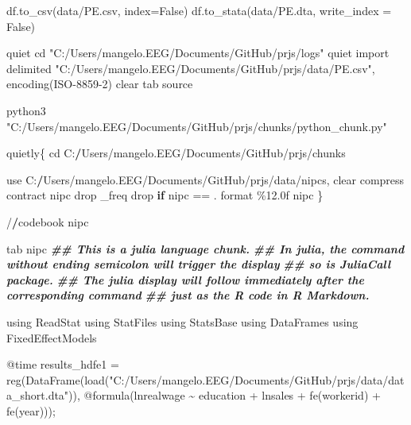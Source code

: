 \documentclass[
  12pt,
]{article}
\newenvironment{Shaded}{\begin{snugshade}}{\end{snugshade}}
\newcommand{\AttributeTok}[1]{\textcolor[rgb]{0.77,0.63,0.00}{#1}}
\newcommand{\ControlFlowTok}[1]{\textcolor[rgb]{0.13,0.29,0.53}{\textbf{#1}}}
\newcommand{\DecValTok}[1]{\textcolor[rgb]{0.00,0.00,0.81}{#1}}
\newcommand{\DocumentationTok}[1]{\textcolor[rgb]{0.56,0.35,0.01}{\textbf{\textit{#1}}}}
\newcommand{\ErrorTok}[1]{\textcolor[rgb]{0.64,0.00,0.00}{\textbf{#1}}}
\newcommand{\FloatTok}[1]{\textcolor[rgb]{0.00,0.00,0.81}{#1}}
\newcommand{\FunctionTok}[1]{\textcolor[rgb]{0.00,0.00,0.00}{#1}}
\newcommand{\NormalTok}[1]{#1}
\newcommand{\OtherTok}[1]{\textcolor[rgb]{0.56,0.35,0.01}{#1}}
\newcommand{\SpecialCharTok}[1]{\textcolor[rgb]{0.00,0.00,0.00}{#1}}
\newcommand{\StringTok}[1]{\textcolor[rgb]{0.31,0.60,0.02}{#1}}
\begin{document}
\begin{Shaded}
\begin{Highlighting}[]
\FunctionTok{df.to\_csv}\NormalTok{(}\StringTok{\textquotesingle{}data/PE.csv\textquotesingle{}}\NormalTok{, }\AttributeTok{index=}\NormalTok{False)}
\FunctionTok{df.to\_stata}\NormalTok{(}\StringTok{\textquotesingle{}data/PE.dta\textquotesingle{}}\NormalTok{, }\AttributeTok{write\_index =}\NormalTok{ False)}


\NormalTok{quiet cd }\StringTok{"C:/Users/mangelo.EEG/Documents/GitHub/prjs/logs"}
\NormalTok{quiet import delimited }\StringTok{"C:/Users/mangelo.EEG/Documents/GitHub/prjs/data/PE.csv"}\NormalTok{, }\FunctionTok{encoding}\NormalTok{(ISO}\DecValTok{{-}8859{-}2}\NormalTok{) clear}
\NormalTok{tab source}

\NormalTok{python3 }\StringTok{"C:/Users/mangelo.EEG/Documents/GitHub/prjs/chunks/python\_chunk.py"}

\NormalTok{quietly\{}
\NormalTok{cd C}\SpecialCharTok{:}\ErrorTok{/}\NormalTok{Users}\SpecialCharTok{/}\NormalTok{mangelo.EEG}\SpecialCharTok{/}\NormalTok{Documents}\SpecialCharTok{/}\NormalTok{GitHub}\SpecialCharTok{/}\NormalTok{prjs}\SpecialCharTok{/}\NormalTok{chunks}

\NormalTok{use C}\SpecialCharTok{:}\ErrorTok{/}\NormalTok{Users}\SpecialCharTok{/}\NormalTok{mangelo.EEG}\SpecialCharTok{/}\NormalTok{Documents}\SpecialCharTok{/}\NormalTok{GitHub}\SpecialCharTok{/}\NormalTok{prjs}\SpecialCharTok{/}\NormalTok{data}\SpecialCharTok{/}\NormalTok{nipcs, clear}
\NormalTok{compress}
\NormalTok{contract nipc}
\NormalTok{drop \_freq}
\NormalTok{drop }\ControlFlowTok{if}\NormalTok{ nipc }\SpecialCharTok{==}\NormalTok{ .}
\NormalTok{format \%}\FloatTok{12.0}\NormalTok{f nipc}
\NormalTok{\}}

\SpecialCharTok{/}\ErrorTok{/}\NormalTok{codebook nipc}

\NormalTok{tab nipc}
\DocumentationTok{\#\# This is a julia language chunk.}
\DocumentationTok{\#\# In julia, the command without ending semicolon will trigger the display}
\DocumentationTok{\#\# so is JuliaCall package.}
\DocumentationTok{\#\# The julia display will follow immediately after the corresponding command}
\DocumentationTok{\#\# just as the R code in R Markdown.}

\NormalTok{using ReadStat}
\NormalTok{using StatFiles}
\NormalTok{using StatsBase}
\NormalTok{using DataFrames}
\NormalTok{using FixedEffectModels}

\SpecialCharTok{@}\NormalTok{time results\_hdfe1 }\OtherTok{=} \FunctionTok{reg}\NormalTok{(}\FunctionTok{DataFrame}\NormalTok{(}\FunctionTok{load}\NormalTok{(}\StringTok{"C:/Users/mangelo.EEG/Documents/GitHub/prjs/data/data\_short.dta"}\NormalTok{)), }\SpecialCharTok{@}\FunctionTok{formula}\NormalTok{(lnrealwage }\SpecialCharTok{\textasciitilde{}}\NormalTok{ education }\SpecialCharTok{+}\NormalTok{ lnsales }\SpecialCharTok{+} \FunctionTok{fe}\NormalTok{(workerid) }\SpecialCharTok{+} \FunctionTok{fe}\NormalTok{(year)));}


\end{Highlighting}
\end{Shaded}
\end{document}
